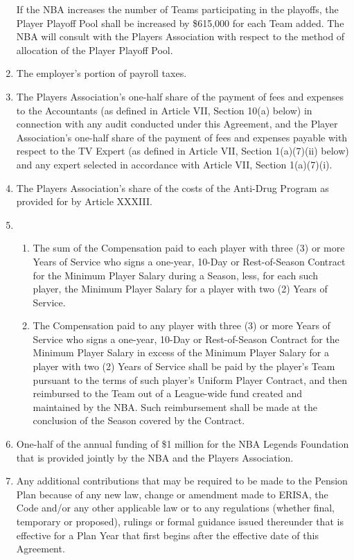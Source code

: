 \documentclass[
]{book}
\providecommand{\tightlist}{%
  \setlength{\itemsep}{0pt}\setlength{\parskip}{0pt}}
\begin{document}
\begin{enumerate}
  If the NBA increases the number of Teams participating in the playoffs, the Player Playoff Pool shall be increased by \$615,000 for each Team added. The NBA will consult with the Players Association with respect to the method of allocation of the Player Playoff Pool.
\item
  The employer's portion of payroll taxes.
\item
  The Players Association's one-half share of the payment of fees and expenses to the Accountants (as defined in Article VII, Section 10(a) below) in connection with any audit conducted under this Agreement, and the Player Association's one-half share of the payment of fees and expenses payable with respect to the TV Expert (as defined in Article VII, Section 1(a)(7)(ii) below) and any expert selected in accordance with Article VII, Section 1(a)(7)(i).
\item
  The Players Association's share of the costs of the Anti-Drug Program as provided for by Article XXXIII.
\item
  \begin{enumerate}
  \def\labelenumii{(\arabic{enumii})}
  \tightlist
  \item
    The sum of the Compensation paid to each player with three (3) or more Years of Service who signs a one-year, 10-Day or Rest-of-Season Contract for the Minimum Player Salary during a Season, less, for each such player, the Minimum Player Salary for a player with two (2) Years of Service.
  \item
    The Compensation paid to any player with three (3) or more Years of Service who signs a one-year, 10-Day or Rest-of-Season Contract for the Minimum Player Salary in excess of the Minimum Player Salary for a player with two (2) Years of Service shall be paid by the player's Team pursuant to the terms of such player's Uniform Player Contract, and then reimbursed to the Team out of a League-wide fund created and maintained by the NBA. Such reimbursement shall be made at the conclusion of the Season covered by the Contract.
  \end{enumerate}
\item
  One-half of the annual funding of \$1 million for the NBA Legends Foundation that is provided jointly by the NBA and the Players Association.
\item
  Any additional contributions that may be required to be made to the Pension Plan because of any new law, change or amendment made to ERISA, the Code and/or any other applicable law or to any regulations (whether final, temporary or proposed), rulings or formal guidance issued thereunder that is effective for a Plan Year that first begins after the effective date of this Agreement.

\end{enumerate}
\end{document}
